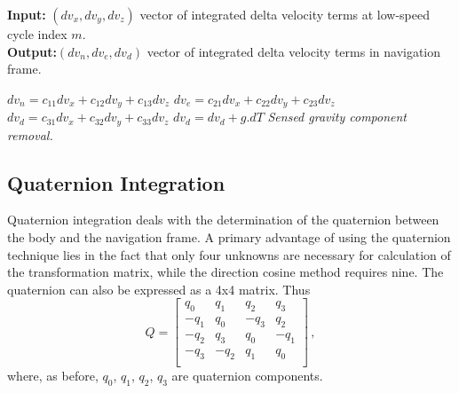 \documentclass[journal]{IEEEtran}
\begin{document}
\begin{algorithm}[h]
\caption{Velocity increment transformation}\label{velinteg}
 \hspace*{\algorithmicindent} \textbf{Input:} $(dv_x, dv_y,dv_z)$ vector of integrated delta velocity terms at low-speed cycle index $m$.\\
 \hspace*{\algorithmicindent} \textbf{Output:}$(dv_n, dv_e,dv_d)$ vector of integrated delta velocity terms in navigation frame. 
\begin{algorithmic}[1]
\State $dv_n = c_{11}dv_x +c_{12}dv_y +c_{13}dv_z$  
\State $dv_e = c_{21}dv_x +c_{22}dv_y +c_{23}dv_z$  
\State $dv_d = c_{31}dv_x +c_{32}dv_y +c_{33}dv_z$ 
\State $dv_d = dv_d + g.dT$ \Comment \textit{Sensed gravity component removal.}
\end{algorithmic}
\end{algorithm}


%
\subsection{Quaternion Integration}
Quaternion integration deals with the determination of the quaternion between the body and the navigation frame.
A primary advantage of using the quaternion technique lies in the fact that only four unknowns are necessary for calculation of the  transformation matrix,  while the direction cosine method requires nine.
The quaternion can also be expressed as a 4x4 matrix. Thus
\begin{equation}
    Q = \left[\begin{array}{rrrr}
         {q_0}&{q_1}&{q_2}&{q_3}\\
         -{q_1}&{q_0}&{-q_3}&{q_2}\\ 
         -{q_2}&{q_3}&{q_0}&{-q_1}\\
         -{q_3}&{-q_2}&{q_1}&{q_0}\\
    \end{array} \right]\,,
    \label{eq_quat_dyn}
\end{equation}
where, as before, $q_0$, $q_1$, $q_2$, $q_3$ are quaternion components.
\end{document}
